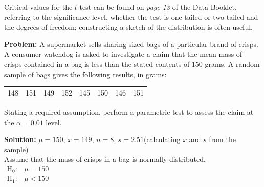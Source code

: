 \documentclass[
  11pt,
]{book}
\begin{document}
Critical values for the \(t\)-test can be found on \emph{page 13} of the Data Booklet, referring to the significance level, whether the test is one-tailed or two-tailed and the degrees of freedom; constructing a sketch of the distribution is often useful.

\pagebreak

\begin{tcolorbox}[title=Example,colback=RoyalBlue!1!,colframe=RoyalBlue]
\textbf{Problem:} A supermarket sells sharing-sized bags of a particular brand of crisps. A consumer watchdog is asked to investigate a claim that the mean mass of crisps contained in a bag is less than the stated contents of 150 grams. A random sample of bags gives the following results, in grams:

\vspace{-0.2cm}

  \begin{center}
  \begin{tabular}{c c c c c c c c} 
      148 & 151 & 149 & 152 & 145 & 150 & 146 & 151\\ 
  \end{tabular}
  \end{center}

\vspace{-0.2cm}

Stating a required assumption, perform a parametric test to assess the claim at the $\alpha=\text{0.01}$ level.

\tcblower
\textbf{Solution:}
$\mu=\text{150}$, $\bar{x}=\text{149}$, $n=\text{8}$, $s=\text{2.51}$\quad (calculating $\bar{x}$ and $s$ from the sample)\\

Assume that the mass of crisps in a bag is normally distributed.\\

\begin{math}
\begin{array}{ll}
      \text{H}_\text{0}: & \mu=\text{150}\\
      \text{H}_\text{1}: & \mu<\text{150}
    \end{array}
\end{math}

\vspace{0.5cm}


\end{tcolorbox}
\end{document}
